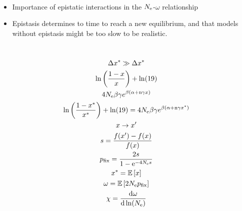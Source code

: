 \documentclass{article}
\begin{document}
\newpage
~\\
\begin{itemize}
	\item Importance of epistatic interactions in the $N_{\mathrm{e}}$-$\omega$ relationship
	\item Epistasis determines to time to reach a new equilibrium, and that models without epistasis might be too slow to be realistic.
\end{itemize}

\newpage
~\\
\begin{gather}
\Delta  x^{*} \gg \Delta  x^{*} \\
\ln \left( \frac{1 - x}{x} \right) + \ln (19) \\
4N_{\mathrm{e}} \beta \gamma e^{\beta (\alpha + \text{n} \gamma x)}\\
\ln \left( \frac{1 - x^{*}}{x^{*}} \right) + \ln (19) = 4N_{\mathrm{e}} \beta \gamma e^{\beta (\alpha + \text{n} \gamma x^{*})}\\
x \rightarrow x' \\
s = \frac{f(x') - f(x)}{f( x)} \\
p_{\text{fix}} = \frac{ 2 s}{1 - \mathrm{e}^{-4N_{\mathrm{e}} s}} \\
x^{*} = \operatorname{\mathbb{E}} \left[ x \right]
\\
\omega = \operatorname{\mathbb{E}} \left[ 2 N_{\mathrm{e}} p_{\text{fix}} \right]\\
\chi = \frac{ \mathrm{d} \omega}{\mathrm{d} \ln (N_{\mathrm{e}})} 
\end{gather}
\end{document}
